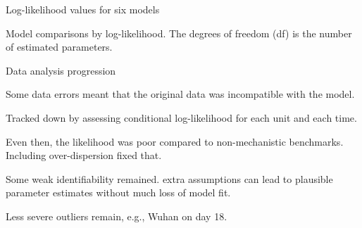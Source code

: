 \documentclass{beamer}
\begin{document}
\begin{frame}{Log-likelihood values for six models}


  \vspace{10mm}
  
Model comparisons by log-likelihood. The degrees of freedom (df) is the number of estimated parameters. 
  

\end{frame}

\begin{frame}{Data analysis progression}
  \bi
\item Some data errors meant that the original data was incompatible with the model.
\item Tracked down by assessing conditional log-likelihood for each unit and each time.
\item Even then, the likelihood was poor compared to non-mechanistic benchmarks. Including over-dispersion fixed that.
\item Some weak identifiability remained. extra assumptions can lead to plausible parameter estimates without much loss of model fit.
\item Less severe outliers remain, e.g., Wuhan on day 18.  
  \ei

\end{frame}
\end{document}
